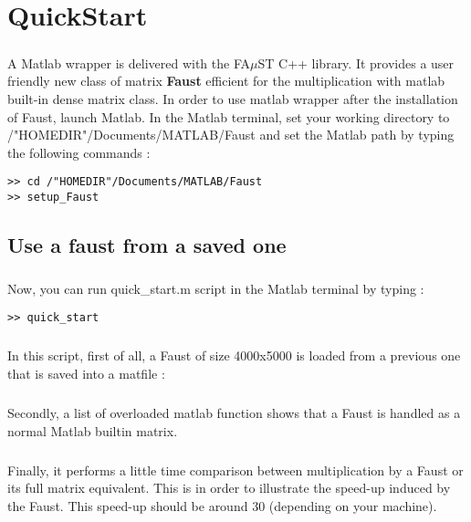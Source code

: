 \chapter{QuickStart}\label{sec:firstUse}


\paragraph{}A Matlab wrapper is delivered with the FA$\mu$ST C++ library.
It provides a user friendly new class of matrix \textbf{Faust} efficient for the multiplication with matlab built-in dense matrix class.\newline
In order to use matlab wrapper after the installation of Faust, launch Matlab.
In the Matlab terminal, set your working directory to /"HOMEDIR"/Documents/MATLAB/Faust and set the Matlab path by typing the following commands :

\begin{lstlisting}
>> cd /"HOMEDIR"/Documents/MATLAB/Faust
>> setup_Faust
\end{lstlisting}

\section{Use a faust from a saved one}\label{sec:firstUseBuildFromSave}
\paragraph{} Now, you can run quick\_start.m script in the Matlab terminal by typing :
\begin{lstlisting}
>> quick_start
\end{lstlisting}
\paragraph{}In this script, first of all, a Faust of size 4000x5000 is loaded from a previous one that is saved into a matfile :

\paragraph{}Secondly, a list of overloaded matlab function shows that a Faust is handled as a normal Matlab builtin matrix.
 


\paragraph{}Finally, it performs a little time comparison between multiplication by a Faust or its full matrix equivalent.
This is in order to illustrate the speed-up induced by the Faust. This speed-up should be around 30 (depending on your machine).



